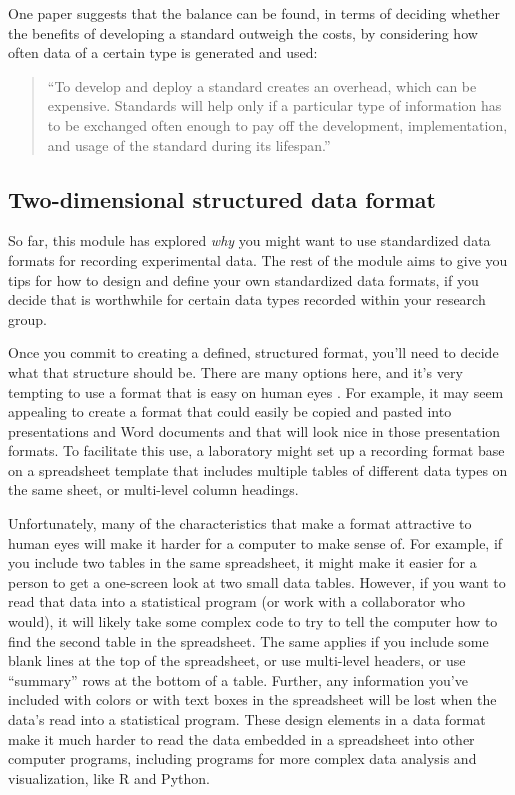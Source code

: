 \documentclass[]{tufte-book}
\begin{document}
One paper suggests that the balance can be found, in terms of deciding whether
the benefits of developing a standard outweigh the costs, by considering how
often data of a certain type is generated and used:

\begin{quote}
``To develop and deploy a standard creates an overhead, which can be expensive.
Standards will help only if a particular type of information has to be
exchanged often enough to pay off the development, implementation, and usage
of the standard during its lifespan.'' \citep{brazma2006standards}
\end{quote}

\hypertarget{two-dimensional-structured-data-format}{%
\subsection{Two-dimensional structured data format}\label{two-dimensional-structured-data-format}}

So far, this module has explored \emph{why} you might want to use standardized
data formats for recording experimental data. The rest of the module
aims to give you tips for how to design and define your own standardized
data formats, if you decide that is worthwhile for certain data types
recorded within your research group.

Once you commit to creating a defined, structured format, you'll need to decide
what that structure should be. There are many options here, and it's very
tempting to use a format that is easy on human eyes
\citep{buffalo2015bioinformatics}. For example, it may seem appealing to create a
format that could easily be copied and pasted into presentations and Word
documents and that will look nice in those presentation formats. To facilitate
this use, a laboratory might set up a recording format base on a spreadsheet
template that includes multiple tables of different data types on the same
sheet, or multi-level column headings.

Unfortunately, many of the characteristics that make a format attractive
to human eyes will make it harder for a computer to make sense of. For example,
if you include two tables in the same spreadsheet, it might make it easier for a
person to get a one-screen look at two small data tables. However, if you want
to read that data into a statistical program (or work with a collaborator who
would), it will likely take some complex code to try to tell the computer how to
find the second table in the spreadsheet. The same applies if you include some
blank lines at the top of the spreadsheet, or use multi-level headers, or use
``summary'' rows at the bottom of a table. Further, any information you've
included with colors or with text boxes in the spreadsheet will be lost when the
data's read into a statistical program. These design elements in a data
format make it much harder to read the data embedded in a spreadsheet into other
computer programs, including programs for more complex data analysis and
visualization, like R and Python.
\end{document}
